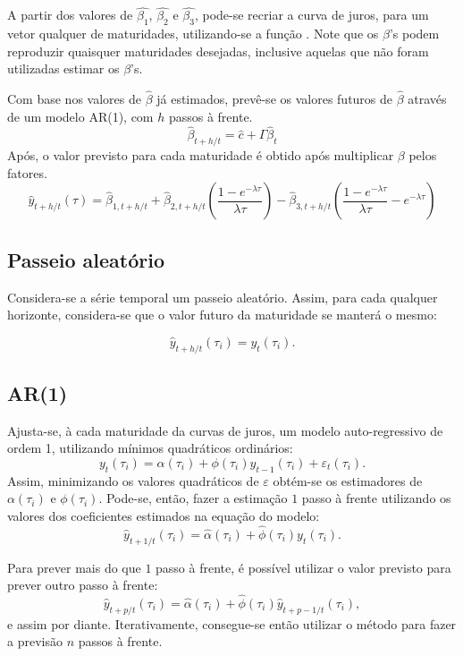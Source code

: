 \documentclass[
	12pt,				%
	openright,			%
	oneside,			%
	a4paper,			%
	english,			%
	brazil				%
	]{dissertacao-ufrgs-abntex2}
\begin{document}
A partir dos valores de  $\hat{\beta_1}$, $\hat{\beta_2}$ e $\hat{\beta_3}$, pode-se recriar a curva de juros, para um vetor qualquer de maturidades, utilizando-se a função . Note que os $\beta$'s podem reproduzir quaisquer maturidades desejadas, inclusive aquelas que não foram utilizadas estimar os $\beta$'s.

Com base nos valores de $\hat{\beta}$ já estimados, prevê-se os valores futuros de $\hat{\beta}$ através de um modelo AR(1), com $h$ passos à frente. 
$$\hat{\beta} _{ t+h/t } = \hat{c} + \hat{\Gamma}\hat{\beta}_t$$
Após, o valor previsto para cada maturidade é obtido após multiplicar $\beta$ pelos fatores.
$$\hat { y } _{ t+h/t }(\tau)=\hat{\beta} _{ 1,t+h/t }+\hat{\beta} _{ 2,t+h/t }\left( \frac { 1-e^{ -\lambda \tau  } }{ \lambda \tau  }  \right) -\hat{\beta} _{ 3,t+h/t }\left( \frac { 1-e^{ -\lambda \tau  } }{ \lambda \tau  } -e^{ -\lambda \tau  } \right)$$


\subsection{Passeio aleatório}
Considera-se a série temporal um passeio aleatório. Assim, para cada qualquer horizonte, considera-se que o valor futuro da maturidade se manterá o mesmo:

\begin{equation}
\hat{y}_{t+h/t}(\tau_i)=y_t(\tau_i).
\end{equation}


\subsection{AR(1)}
Ajusta-se, à cada maturidade da curvas de juros, um modelo auto-regressivo de ordem 1, utilizando mínimos quadráticos ordinários:
$$y_t(\tau_i)=\alpha(\tau_i) + \phi(\tau_i) y_{t-1}(\tau_i)+\varepsilon_{t}(\tau_i).$$
Assim, minimizando os valores quadráticos de $\varepsilon$ obtém-se os estimadores de $\alpha(\tau_i)$ e $\phi(\tau_i)$.
Pode-se, então, fazer a estimação $1$ passo à frente utilizando os valores dos coeficientes estimados na equação do modelo:
\begin{equation}
\hat{y}_{t+1/t}(\tau_i)=\hat{\alpha}(\tau_i) + \hat{\phi}(\tau_i) y_t(\tau_i).
\end{equation}

Para prever mais do que $1$ passo à frente, é possível utilizar o valor previsto para prever outro passo à frente:
\begin{equation}
\hat{y}_{t+p/t}(\tau_i)=\hat{\alpha}(\tau_i) + \hat{\phi}(\tau_i) \hat{y}_{t+p-1/t}(\tau_i),
\end{equation}
e assim por diante. Iterativamente, consegue-se então utilizar o método para fazer a previsão $n$ passos à frente.
\end{document}
